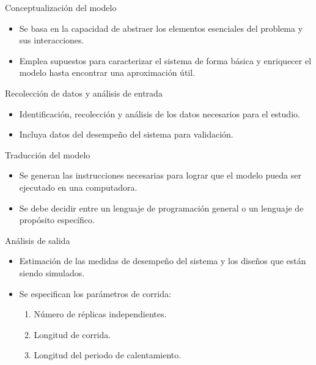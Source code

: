\begin{frame}{Conceptualización del modelo}
    \begin{itemize}
        \item Se basa en la capacidad de abstraer los elementos esenciales del problema y sus interacciones.
        \item Emplea supuestos para caracterizar el sistema de forma básica y enriquecer el modelo hasta encontrar una aproximación útil.
    \end{itemize}
\end{frame}

\begin{frame}{Recolección de datos y análisis de entrada}
    \begin{itemize}
        \item Identificación, recolección y análisis de los datos necesarios para el estudio.
        \item Incluya datos del desempeño del sistema para validación.
    \end{itemize}
\end{frame}

\begin{frame}{Traducción del modelo}
    \begin{itemize}
        \item Se generan las instrucciones necesarias para lograr que el modelo pueda ser ejecutado en una computadora.
        \item Se debe decidir entre un lenguaje de programación general o un lenguaje de propósito específico.
    \end{itemize}
\end{frame}

\begin{frame}{Análisis de salida}
    \begin{itemize}
        \item Estimación de las medidas de desempeño del sistema y los diseños que están siendo simulados. 
        \item Se especifican los parámetros de corrida:
        \begin{enumerate}
            \item Número de réplicas independientes.
            \item Longitud de corrida.
            \item Longitud del periodo de calentamiento.
        \end{enumerate}
    \end{itemize}
\end{frame}

